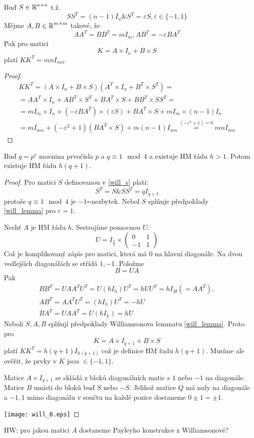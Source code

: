 \begin{lemma}[Williamson]\label{will_lemma}
    Buď $S\in\operatorname{\mathbb{R}}^{n\times n}$ t.ž.
    \[ SS^T=(n-1)I_n \& S^T=\varepsilon S, \varepsilon\in \{-1,1\} \]
    Mějme $A,B\in\operatorname{\mathbb{R}}^{m\times m}$ takové, že
    \[ AA^T=BB^T=mI_m, AB^T=-\varepsilon BA^T \]
    Pak pro matici
    \[ K=A\times I_n + B\times S \]
    platí $KK^T=mnI_{mn}$.
\end{lemma}
\begin{proof}
	\begin{gather*}
		KK^T = (A \times I_n + B \times S)(A^T \times I_n + B^T \times S^T) = \\
		= AA^T \times I_n + AB^T \times S^T + BA^T \times S + BB^T \times SS^T = \\
		= m I_m \times I_n + (-\varepsilon BA^T) \times (\varepsilon S) + BA^T \times S + m I_m \times (n - 1)  I_n \\
		= m I_{mn} + (-\varepsilon^2 + 1)(BA^T \times S) + m(n - 1) I_{mn} \stackrel{(-\varepsilon^2 + 1) = 0}{=} mn I_{mn}
	\end{gather*}
\end{proof}
\begin{theorem}
    Buď $q=p^r$ mocnina prvočísla $p$ a $q\equiv 1\mod 4$ a existuje HM řádu $h>1$.
    Potom existuje HM řádu $h(q+1)$.
\end{theorem}
\begin{proof}
	Pro matici $S$ definovanou v \eqref{will_s} platí:
	\[ S^T = S \& SS^T = q I_{q + 1} \]
	protože $q \equiv 1 \mod4$ je $-1 \square$-nezbytek. Nebol $S$ splňuje předpoklady \cref{will_lemma} pro $\varepsilon = 1$.

	Nechť $A$ je HM řádu $h$.
	Sestrojíme pomocnou $U$:
	\[ U = I_{\frac{h}{2}} \times \begin{pmatrix} 0 & 1 \\ -1 & 1 \end{pmatrix} \]
	Což je komplikovaný zápis pro matici, která má 0 na hlavní diagonále.
	Na dvou vedlejších diagonálách se střídá $1, -1$.
	Položme
	\[ B = UA \]
	Pak
	\begin{gather*}
		BB^T = UAA^TU^T = U(hI_h)U^T = hUU^T = hI_H(= AA^T), \\
		AB^T = AA^TU^T = (hI_h)U^T = -hU\\
		BA^T = UAA^T = U(hI_h) = hU
	\end{gather*}
	Neboli $S, A, B$ splňují předpoklady Williamsonova lemmatu \cref{will_lemma}.
	Proto pro
	\[ K = A \times I_{q + 1} + B \times S \]
	platí $KK^T = h(q + 1)I_{h(q + 1)}$ což je definice HM řadu $h(q + 1)$.
	Musíme ale ověřit, že prvky v $K$ jsou $\in \{ -1, 1 \}$.

	Matice $A \times I_{q + 1}$ se skládá z bloků diagonálních matic s $1$ nebo $-1$ na diagonále.
	Matice $B$ umísti do bloků buď $S$ nebo $-S$.
	Jelikož matice $Q$ má nuly na diagonále a ${-1, 1}$ mimo diagonálu v součtu na každé pozice dostaneme $0 \pm 1 = \pm 1$.

	\texttt{[image: will\_0.eps]}
\end{proof}

HW: pro jakou matici $A$ dostaneme Payleyho konstrukce z Williamsonové?

